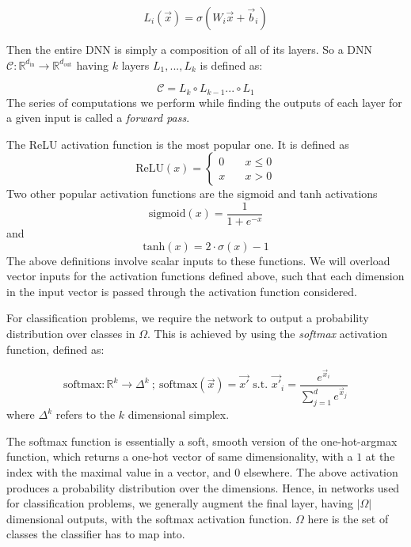 \documentclass[12pt, oneside]{book}
\begin{document}
\begin{equation*}
    L_i(\vec{x})
    = \sigma(W_i\vec{x} + \vec{b}_i)
\end{equation*}

Then the entire DNN is simply a composition of all of its layers. So a DNN
$\mathcal{C}: \mathbb{R}^{d_\text{in}} \to \mathbb{R}^{d_\text{out}}$ having $k$
layers $L_1,...,L_k$ is defined as:

\begin{equation*}
    \mathcal{C} = L_k \circ L_{k-1} ... \circ L_1
\end{equation*}
The series of computations we perform while finding the outputs of each layer
for a given input is called a \emph{forward pass}.

The ReLU activation function is the most popular one. It is defined as
\begin{equation*}
    \text{ReLU}(x) = 
    \left\{
        \begin{array}{ll}
            0 & \quad x \leq 0 \\
            x & \quad x > 0
        \end{array}
    \right.
\end{equation*}
Two other popular activation functions are the sigmoid and tanh activations
\begin{equation*}
    \text{sigmoid}(x)=\frac{1}{1+e^{-x}}
\end{equation*} and
\begin{equation*}
    \text{tanh}(x) = 2\cdot\sigma(x) - 1
\end{equation*}
The above definitions involve scalar inputs to these functions. We will overload
vector inputs for the activation functions defined above, such that each
dimension in the input vector is passed through the activation function
considered.

For classification problems, we require the network to output a probability
distribution over classes in $\Omega$. This is achieved by using the
\emph{softmax} activation function, defined as:

\begin{equation*}
    \text{softmax}: \mathbb{R}^k \to \Delta^k~;~
    \text{softmax}(\vec{x}) = \vec{x'} \text{ s.t. } 
    \vec{x'}_i = \frac{e^{\vec{x}_i}}{\sum_{j=1}^{d}e^{\vec{x}_j}}
\end{equation*}
where $\Delta^k$ refers to the $k$ dimensional simplex.

The softmax function is essentially a soft, smooth version of the one-hot-argmax
function, which returns a one-hot vector of same dimensionality, with a $1$ at
the index with the maximal value in a vector, and 0 elsewhere. The above
activation produces a probability distribution over the dimensions. Hence, in
networks used for classification problems, we generally augment the final layer,
having $|\Omega|$ dimensional outputs, with the softmax activation function.
$\Omega$ here is the set of classes the classifier has to map into.
\end{document}
